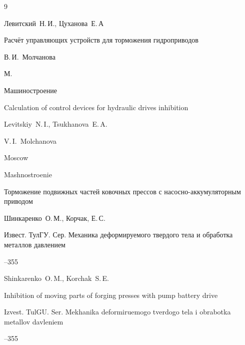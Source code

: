 \begin{thebibliography}{9}




\by Левитский~Н.\,И., Цуханова~Е.\,А 

\book Расчёт управляющих устройств для торможения гидроприводов 

\ed В.\,И.~Молчанова 

\publaddr М. 

\publ Машиностроение 



\misctransl

\book Calculation of control devices for hydraulic drives inhibition

\by Levitskiy~N.\,I., Tsukhanova~E.\,A.

\ed V.\,I.~Molchanova

\publaddr Moscow

\publ Mashnostroenie








\paper Торможение подвижных частей ковочных прессов с насосно-аккумуляторным приводом

\by Шинкаренко~О.\,М., Корчак, Е.\,С.

\jour Извест. ТулГУ. Сер. Механика деформируемого твердого тела и обработка металлов давлением



--355

\misctransl

\by Shinkarenko~O.\,M., Korchak~S.\,E.

\paper Inhibition of moving parts of forging presses with pump battery drive

\jour Izvest. TulGU. Ser. Mekhanika deformiruemogo tverdogo tela i obrabotka metallov davleniem



--355









\end{thebibliography}

